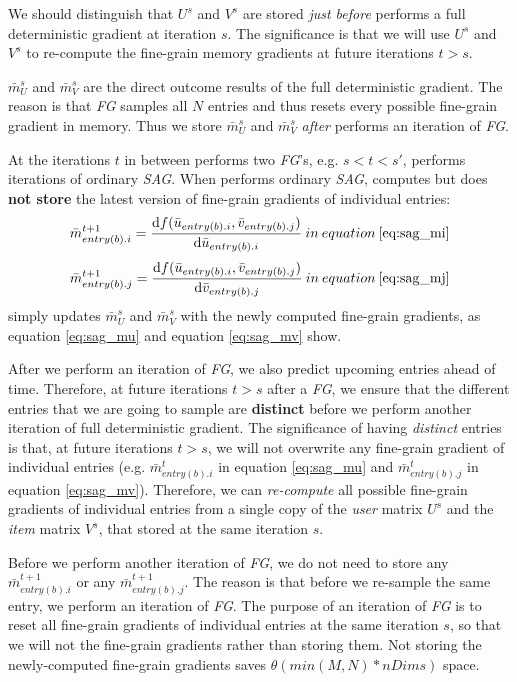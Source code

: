 We should distinguish that $U^{s}$ and $V^{s}$ are stored \emph{just before} \tool performs a full deterministic gradient at iteration $s$.
The significance is that we will use $U^{s}$ and $V^{s}$ to re-compute the fine-grain memory gradients at future iterations $t > s$.

$\bar{m}_{U}^{s}$ and $\bar{m}_{V}^{s}$ are the direct outcome results of the full deterministic gradient.  
The reason is that \emph{FG} samples all $N$ entries and thus resets every possible fine-grain gradient in memory.
Thus we store $\bar{m}_{U}^{s}$ and $\bar{m}_{V}^{s}$ \emph{after} \tool performs an iteration of \emph{FG}.

At the iterations $t$ in between \tool performs two \emph{FG}'s, e.g. $s < t < s'$, \tool performs iterations of ordinary \emph{SAG}.
When \tool performs ordinary \emph{SAG}, \tool computes but does \textbf{not store} the latest version of fine-grain gradients of individual entries: 
\[
\bar{m}_{entry(b).i}^{t+1} = \frac{\text{d}f(\bar{u}_{entry(b).i}, \bar{v}_{entry(b).j})}{\text{d}\bar{u}_{entry(b).i}}\:in\:equation\:\ref{eq:sag_mi}
\]
\[
\bar{m}_{entry(b).j}^{t+1} = \frac{\text{d}f(\bar{u}_{entry(b).i}, \bar{v}_{entry(b).j})}{\text{d}\bar{v}_{entry(b).j}}\:in\:equation\:\ref{eq:sag_mj}
\]
\tool simply updates $\bar{m}_{U}^{s}$ and $\bar{m}_{V}^{s}$ with the newly computed fine-grain gradients, as equation \ref{eq:sag_mu} and equation \ref{eq:sag_mv} show.

After we perform an iteration of \emph{FG}, we also predict upcoming entries ahead of time.
Therefore, at future iterations $t > s$ after a \emph{FG}, we ensure that the different entries that we are going to sample are \textbf{distinct} before we perform another iteration of full deterministic gradient.
The significance of having \emph{distinct} entries is that, at future iterations $t > s$, we will not overwrite any fine-grain gradient of individual entries 
(e.g. $\bar{m}_{entry(b).i}^{t}$ in equation \ref{eq:sag_mu} and $\bar{m}_{entry(b).j}^{t}$ in equation \ref{eq:sag_mv}).
Therefore, we can \emph{re-compute} all possible fine-grain gradients of individual entries 
from a single copy of the \emph{user} matrix $U^{s}$ and the \emph{item} matrix $V^{s}$, 
that \tool stored at the same iteration $s$.

Before we perform another iteration of \emph{FG}, we do not need to store any $\bar{m}_{entry(b).i}^{t+1}$ or any $\bar{m}_{entry(b).j}^{t+1}$.
The reason is that before we re-sample the same entry, we perform an iteration of \emph{FG}.
The purpose of an iteration of \emph{FG} is to reset all fine-grain gradients of individual entries at the same iteration $s$, 
so that we will not  the fine-grain gradients rather than storing them.
Not storing the newly-computed fine-grain gradients saves $\theta(min(M,N)*nDims)$ space.


